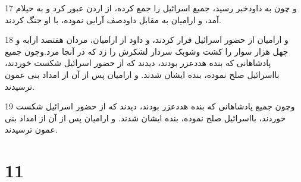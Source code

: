 \par 17 و چون به داودخبر رسید، جمیع اسرائیل را جمع کرده، از اردن عبور کرد و به حیلام آمد، و ارامیان به مقابل داودصف آرایی نموده، با او جنگ کردند. 
\par 18 و ارامیان از حضور اسرائیل فرار کردند، و داود از ارامیان، مردان هفتصد ارابه و چهل هزار سوار را کشت وشوبک سردار لشکرش را زد که در آنجا مرد.وچون جمیع پادشاهانی که بنده هددعزر بودند، دیدند که از حضور اسرائیل شکست خوردند، بااسرائیل صلح نموده، بنده ایشان شدند. و ارامیان پس از آن از امداد بنی عمون ترسیدند.
\par 19 وچون جمیع پادشاهانی که بنده هددعزر بودند، دیدند که از حضور اسرائیل شکست خوردند، بااسرائیل صلح نموده، بنده ایشان شدند. و ارامیان پس از آن از امداد بنی عمون ترسیدند.
 
\chapter{11}

